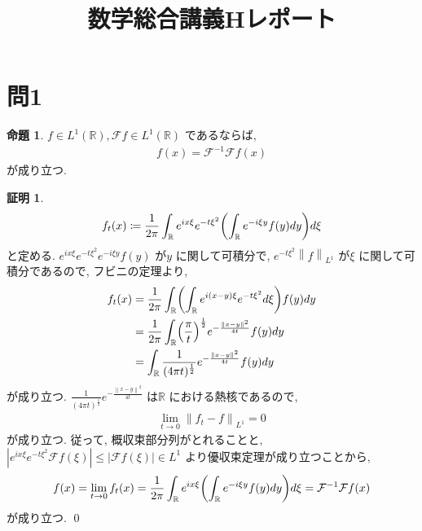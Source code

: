 \documentclass[10pt, fleqn, label-section=none]{bxjsarticle}
\title{数学総合講義Hレポート}
\date{}
\author{}
\theoremstyle{definition}
\newtheorem{prop}[dfn]{命題}
\newtheorem*{pf*}{証明}
\newcommand{\paren}[1]{\mleft( #1\mright )}
\newcommand{\abs}[1]{\left|#1\right|}
\newcommand{\norm}[1]{\left\|#1\right\|}
\renewcommand{\;}{\, ; \,}
\begin{document}
\maketitle

\section{問1}
\begin{prop}$f \in L^1(\mathbb R), \mathcal F f \in L^1(\mathbb R)$ であるならば, 
\begin{align*} f(x) = \mathcal F^{-1} \mathcal F f(x)  \end{align*}
が成り立つ. 
\end{prop}
\begin{pf*}

\begin{align*} f_t(x)              \coloneqq                  \frac{1}{2 \pi} \int_{\mathbb R} e^{ix \xi} e^{-t \xi ^2} \paren{\int_{\mathbb R} e^{- i \xi y} f(y) dy } d \xi                 \end{align*}
と定める. $e^{ix \xi} e^{-t \xi ^2} e^{- i \xi y} f(y)$ が$y$ に関して可積分で, $e^{- t \xi ^2} \norm{f}_{L^1}$ が$\xi$ に関して可積分であるので, フビニの定理より, 
\begin{align*} f_t (x) &=     \frac{1}{2 \pi} \int_{\mathbb R} \paren{ \int_{\mathbb R} e^{i(x - y) \xi} e^{-t \xi ^2}  d\xi }   f(y)                   dy \\&= \frac{1}{2 \pi} \int_{\mathbb R} \paren{\frac{ \pi }{t}}^{\frac{1}{2}} e^{- \frac{\norm{x - y} ^2 }{4t}}  f(y)      dy     \\& =    \int_{\mathbb R} \frac{1}{(4 \pi t)^{\frac{1}{2}}} e^{- \frac{\norm{x - y} ^2 }{4t}}  f(y)      dy      \end{align*}
が成り立つ. $\frac{1}{(4 \pi t)^{\frac{1}{2}}} e^{- \frac{\norm{x - y} ^2 }{4t}} $ は$\mathbb R$ における熱核であるので, 
\begin{align*} \lim_{t \rightarrow 0} \norm{f_t - f}_{L^1} = 0 \end{align*} 
が成り立つ. 従って, 概収束部分列がとれることと, $\abs{e^{ix\xi}e^{-t\xi^2} \mathcal F f (\xi)} \leq \abs{\mathcal F f(\xi)}  \in L^1$ より優収束定理が成り立つことから, 
\begin{align*} f(x) = \lim_{t \rightarrow 0} f_t (x) =  \frac{1}{2 \pi} \int_{\mathbb R} e^{ix \xi} \paren{\int_{\mathbb R} e^{- i \xi y} f(y) dy } d \xi   = \mathcal F^{-1} \mathcal F f (x) \end{align*}
が成り立つ. 
\qed
\end{pf*}
\end{document}
